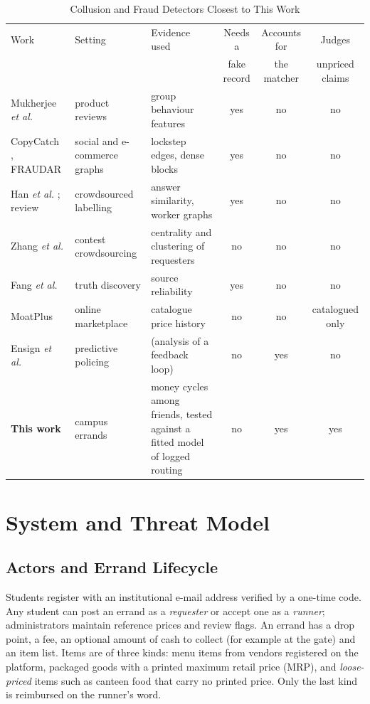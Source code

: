 \documentclass[journal]{IEEEtran}
\begin{document}
\begin{table}[!t]
\caption{Collusion and Fraud Detectors Closest to This Work}
\label{tab:positioning}
\centering
\footnotesize
\begin{tabular}{@{}>{\raggedright}p{}>{\raggedright}p{}>{\raggedright}p{}ccc@{}}
\toprule
Work & Setting & Evidence used & Needs a & Accounts for & Judges \\
& & & fake record & the matcher & unpriced claims \\
\midrule
Mukherjee \emph{et al.} \cite{mukherjee2012spotting} & product reviews & group
behaviour features & yes & no & no \\
CopyCatch \cite{beutel2013copycatch}, FRAUDAR \cite{hooi2016fraudar} & social and
e-commerce graphs & lockstep edges, dense blocks & yes & no & no \\
Han \emph{et al.} \cite{han2025anonymous}; review \cite{xu2025collusionreview} &
crowdsourced labelling & answer similarity, worker graphs & yes & no & no \\
Zhang \emph{et al.} \cite{zhang2026sna} & contest crowdsourcing & centrality and
clustering of requesters & no & no & no \\
Fang \emph{et al.} \cite{fang2021poisoning} & truth discovery & source reliability &
yes & no & no \\
MoatPlus \cite{sarpal2023marketplace} & online marketplace & catalogue price history
& no & no & catalogued only \\
Ensign \emph{et al.} \cite{ensign2018runaway} & predictive policing & (analysis of a
feedback loop) & no & yes & no \\
\textbf{This work} & campus errands & money cycles among friends, tested against a
fitted model of logged routing & no & yes & yes \\
\bottomrule
\end{tabular}
\end{table}

\section{System and Threat Model}\label{sec:model}

\subsection{Actors and Errand Lifecycle}
Students register with an institutional e-mail address verified by a one-time
code. Any student can post an errand as a \emph{requester} or accept one as a
\emph{runner}; administrators maintain reference prices and review flags. An errand
has a drop point, a fee, an optional amount of cash to collect (for example at the
gate) and an item list. Items are of three kinds: menu items from vendors registered
on the platform, packaged goods with a printed maximum retail price (MRP), and
\emph{loose-priced} items such as canteen food that carry no printed price. Only the
last kind is reimbursed on the runner's word.
\end{document}
